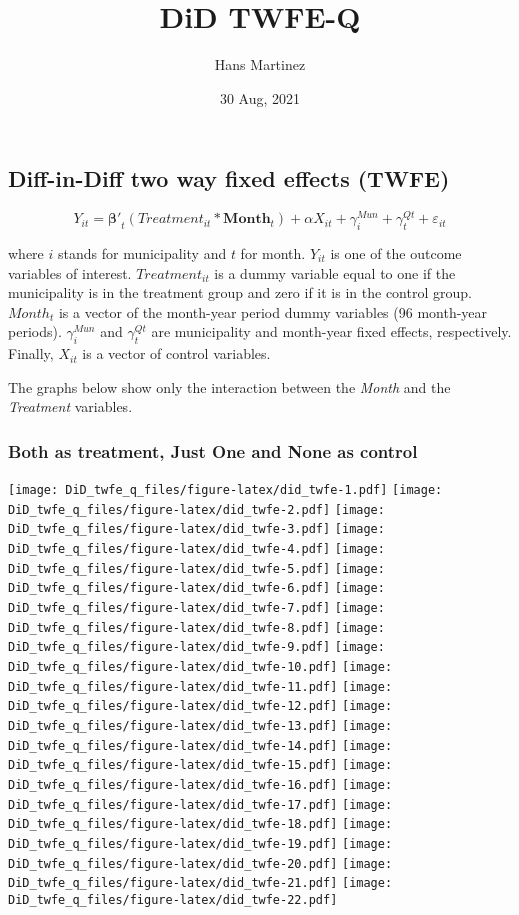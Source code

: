 \documentclass[
]{article}
\title{DiD TWFE-Q}
\author{Hans Martinez}
\date{30 Aug, 2021}
\begin{document}
\maketitle

\hypertarget{diff-in-diff-two-way-fixed-effects-twfe}{%
\subsection{Diff-in-Diff two way fixed effects
(TWFE)}\label{diff-in-diff-two-way-fixed-effects-twfe}}

\begin{equation}
  Y_{it}=\bm{\beta'}_{t}(Treatment_{it}*\bm{Month}_{t}) + \alpha X_{it} + \gamma^{Mun}_{i} + \gamma^{Qt}_{t}  + \varepsilon_{it}
\end{equation}

where \(i\) stands for municipality and \(t\) for month. \(Y_{it}\) is
one of the outcome variables of interest. \(Treatment_{it}\) is a dummy
variable equal to one if the municipality is in the treatment group and
zero if it is in the control group. \(Month_{t}\) is a vector of the
month-year period dummy variables (96 month-year periods).
\(\gamma^{Mun}_{i}\) and \(\gamma^{Qt}_{t}\) are municipality and
month-year fixed effects, respectively. Finally, \(X_{it}\) is a vector
of control variables.

The graphs below show only the interaction between the \emph{Month} and
the \emph{Treatment} variables.

\hypertarget{both-as-treatment-just-one-and-none-as-control}{%
\subsubsection{Both as treatment, Just One and None as
control}\label{both-as-treatment-just-one-and-none-as-control}}

\texttt{[image: DiD\_twfe\_q\_files/figure-latex/did\_twfe-1.pdf]}
\texttt{[image: DiD\_twfe\_q\_files/figure-latex/did\_twfe-2.pdf]}
\texttt{[image: DiD\_twfe\_q\_files/figure-latex/did\_twfe-3.pdf]}
\texttt{[image: DiD\_twfe\_q\_files/figure-latex/did\_twfe-4.pdf]}
\texttt{[image: DiD\_twfe\_q\_files/figure-latex/did\_twfe-5.pdf]}
\texttt{[image: DiD\_twfe\_q\_files/figure-latex/did\_twfe-6.pdf]}
\texttt{[image: DiD\_twfe\_q\_files/figure-latex/did\_twfe-7.pdf]}
\texttt{[image: DiD\_twfe\_q\_files/figure-latex/did\_twfe-8.pdf]}
\texttt{[image: DiD\_twfe\_q\_files/figure-latex/did\_twfe-9.pdf]}
\texttt{[image: DiD\_twfe\_q\_files/figure-latex/did\_twfe-10.pdf]}
\texttt{[image: DiD\_twfe\_q\_files/figure-latex/did\_twfe-11.pdf]}
\texttt{[image: DiD\_twfe\_q\_files/figure-latex/did\_twfe-12.pdf]}
\texttt{[image: DiD\_twfe\_q\_files/figure-latex/did\_twfe-13.pdf]}
\texttt{[image: DiD\_twfe\_q\_files/figure-latex/did\_twfe-14.pdf]}
\texttt{[image: DiD\_twfe\_q\_files/figure-latex/did\_twfe-15.pdf]}
\texttt{[image: DiD\_twfe\_q\_files/figure-latex/did\_twfe-16.pdf]}
\texttt{[image: DiD\_twfe\_q\_files/figure-latex/did\_twfe-17.pdf]}
\texttt{[image: DiD\_twfe\_q\_files/figure-latex/did\_twfe-18.pdf]}
\texttt{[image: DiD\_twfe\_q\_files/figure-latex/did\_twfe-19.pdf]}
\texttt{[image: DiD\_twfe\_q\_files/figure-latex/did\_twfe-20.pdf]}
\texttt{[image: DiD\_twfe\_q\_files/figure-latex/did\_twfe-21.pdf]}
\texttt{[image: DiD\_twfe\_q\_files/figure-latex/did\_twfe-22.pdf]}
\end{document}
